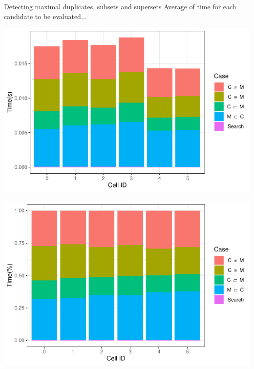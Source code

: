 \documentclass{beamer}
\begin{document}
\begin{frame}{Detecting maximal duplicates, subsets and supersets}
        {Average of time for each candidate to be evaluated...}
        \centering
        \begin{minipage}{0.49\textwidth}
                \includegraphics[width=\textwidth]{figures/Maximals/performanceByMean1}
        \end{minipage} %
        \begin{minipage}{0.49\textwidth}
                \includegraphics[width=\textwidth]{figures/Maximals/performanceByMean2}
        \end{minipage}
\end{frame}
\end{document}
